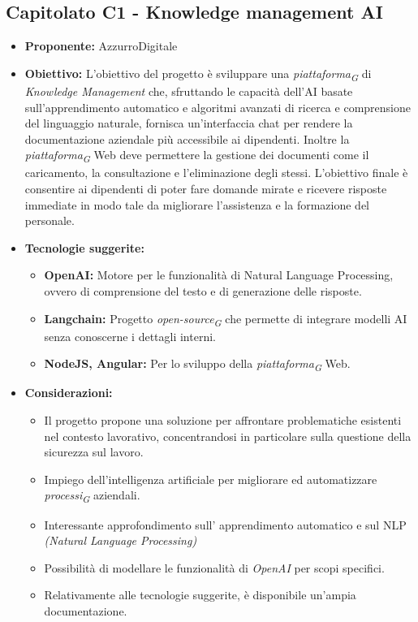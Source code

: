 \documentclass{article}
\begin{document}

\subsection{\textbf{Capitolato C1} - Knowledge management AI}
\begin{itemize}
    \item[] \textbf{Proponente:} AzzurroDigitale
    
    \item[] \textbf{Obiettivo:} L'obiettivo del progetto è sviluppare una \textit{piattaforma}\textsubscript{\textit{G}} di \textit{Knowledge Management} che, sfruttando le capacità dell’AI basate sull’apprendimento automatico e algoritmi avanzati di ricerca e comprensione del linguaggio naturale, fornisca un'interfaccia chat per rendere la documentazione aziendale più accessibile ai dipendenti.
    Inoltre la \textit{piattaforma}\textsubscript{\textit{G}} Web deve permettere la gestione dei documenti come il caricamento, la consultazione e l'eliminazione degli stessi.
    L'obiettivo finale è consentire ai dipendenti di poter fare domande mirate e ricevere risposte immediate in modo tale da migliorare l'assistenza e la formazione del personale.

    \item[] \textbf{Tecnologie suggerite:}
    \begin{itemize}
        \item \textbf{OpenAI:} Motore per le funzionalità di Natural Language Processing, ovvero di comprensione del testo e di generazione delle risposte.
        \item \textbf{Langchain:} Progetto \textit{open-source}\textsubscript{\textit{G}} che permette di integrare modelli AI senza conoscerne i dettagli interni.
        \item \textbf{NodeJS, Angular:} Per lo sviluppo della \textit{piattaforma}\textsubscript{\textit{G}} Web.  
    \end{itemize}
    
    \item[] \textbf{Considerazioni:}
    \begin{itemize}
        \item Il progetto propone una soluzione per affrontare problematiche esistenti nel contesto lavorativo, concentrandosi in particolare sulla questione della sicurezza sul lavoro.
        \item Impiego dell’intelligenza artificiale per migliorare ed automatizzare \textit{processi}\textsubscript{\textit{G}} aziendali.
        \item Interessante approfondimento sull’ apprendimento automatico e sul NLP \textit{(Natural Language Processing)}
        \item Possibilità di modellare le funzionalità di \textit{OpenAI} per scopi specifici.
        \item Relativamente alle tecnologie suggerite, è disponibile un'ampia documentazione.
    \end{itemize}
    
\end{itemize}
\pagebreak
\end{document}
